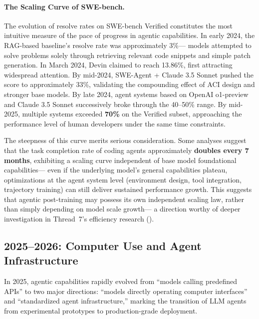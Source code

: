 \paragraph{The Scaling Curve of SWE-bench.}
The evolution of resolve rates on SWE-bench Verified
constitutes the most intuitive measure of the pace of progress in agentic capabilities.
In early 2024, the RAG-based baseline's resolve rate was approximately 3\%---
models attempted to solve problems solely through retrieving relevant code snippets and simple patch generation.
In March 2024, Devin claimed to reach 13.86\%, first attracting widespread attention.
By mid-2024, SWE-Agent + Claude 3.5 Sonnet pushed the score to approximately 33\%,
validating the compounding effect of ACI design and stronger base models.
By late 2024, agent systems based on OpenAI o1-preview and Claude 3.5 Sonnet
successively broke through the 40--50\% range.
By mid-2025, multiple systems exceeded \textbf{70\%} on the Verified subset,
approaching the performance level of human developers under the same time constraints.

The steepness of this curve merits serious consideration.
Some analyses suggest that the task completion rate of coding agents approximately \textbf{doubles every 7 months},
exhibiting a scaling curve independent of base model foundational capabilities---
even if the underlying model's general capabilities plateau,
optimizations at the agent system level (environment design, tool integration, trajectory training)
can still deliver sustained performance growth.
This suggests that agentic post-training may possess its own independent scaling law,
rather than simply depending on model scale growth---
a direction worthy of deeper investigation in Thread~7's efficiency research
().



\subsection{2025--2026: Computer Use and Agent Infrastructure}
\label{sec:t6-computer-use}

In 2025, agentic capabilities rapidly evolved from ``models calling predefined APIs''
to two major directions: ``models directly operating computer interfaces'' and ``standardized agent infrastructure,''
marking the transition of LLM agents from experimental prototypes to production-grade deployment.

